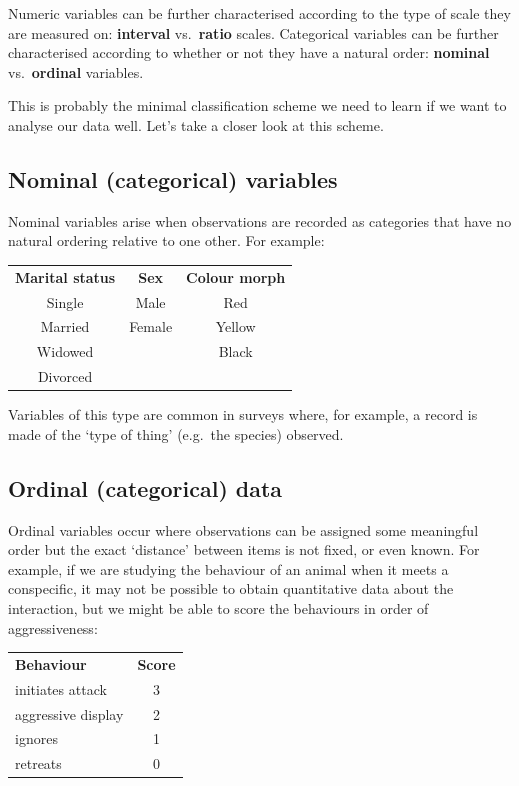 \documentclass[
]{book}
\begin{document}
Numeric variables can be further characterised according to the type of scale they are measured on: \textbf{interval} vs.~\textbf{ratio} scales. Categorical variables can be further characterised according to whether or not they have a natural order: \textbf{nominal} vs.~\textbf{ordinal} variables.

This is probably the minimal classification scheme we need to learn if we want to analyse our data well. Let's take a closer look at this scheme.

\hypertarget{nominal-categorical-variables}{%
\subsection{Nominal (categorical) variables}\label{nominal-categorical-variables}}

Nominal variables arise when observations are recorded as categories that have no natural ordering relative to one other. For example:

\begin{longtable}[]{@{}ccc@{}}
\toprule()
\endhead
\textbf{Marital status} & \textbf{Sex} & \textbf{Colour morph} \\
Single & Male & Red \\
Married & Female & Yellow \\
Widowed & & Black \\
Divorced & & \\
\bottomrule()
\end{longtable}

Variables of this type are common in surveys where, for example, a record is made of the `type of thing' (e.g.~the species) observed.

\hypertarget{ordinal-categorical-data}{%
\subsection{Ordinal (categorical) data}\label{ordinal-categorical-data}}

Ordinal variables occur where observations can be assigned some meaningful order but the exact `distance' between items is not fixed, or even known. For example, if we are studying the behaviour of an animal when it meets a conspecific, it may not be possible to obtain quantitative data about the interaction, but we might be able to score the behaviours in order of aggressiveness:

\begin{longtable}[]{@{}lc@{}}
\toprule()
\endhead
\textbf{Behaviour} & \textbf{Score} \\
initiates attack & 3 \\
aggressive display & 2 \\
ignores & 1 \\
retreats & 0 \\
\bottomrule()
\end{longtable}
\end{document}
